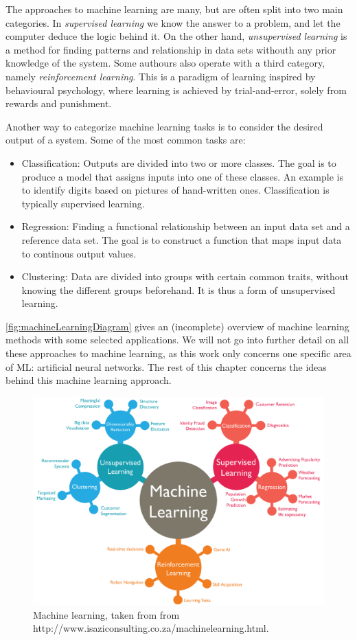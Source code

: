\documentclass[twoside,english]{uiofysmaster}
\begin{document}
The approaches to machine learning are many, but are often split into two main categories. 
In \textit{supervised learning} we know the answer to a problem,
and let the computer deduce the logic behind it. On the other hand, \textit{unsupervised learning}
is a method for finding patterns and relationship in data sets withouth any prior knowledge of the system.
Some authours also operate with a third category, namely \textit{reinforcement learning}. This is a paradigm 
of learning inspired by behavioural psychology, where learning is achieved by trial-and-error, 
solely from rewards and punishment.

Another way to categorize machine learning tasks is to consider the desired output of a system.
Some of the most common tasks are:
\begin{itemize}
 \item Classification: Outputs are divided into two or more classes. The goal is to 
 produce a model that assigns inputs into one of these classes. An example is to identify
 digits based on pictures of hand-written ones. Classification is typically supervised learning.  
 \item Regression: Finding a functional relationship between an input data set and a reference data set. 
 The goal is to construct a function that maps input data to continous output values. 
 \item Clustering: Data are divided into groups with certain common traits, without knowing the different groups beforehand.
 It is thus a form of unsupervised learning.  
\end{itemize} 
\autoref{fig:machineLearningDiagram} gives an (incomplete) overview of machine learning methods with some selected applications.
We will not go into further detail on all these approaches to machine learning, as this work only concerns
one specific area of ML: artificial neural networks. The rest of this chapter concerns the ideas behind this machine learning
approach. 
\begin{figure}
\begin{center}
 \includegraphics[width = \linewidth]{Figures/Theory/MachineLearningDiagram.png}
 \caption{Machine learning, taken from from http://www.isaziconsulting.co.za/machinelearning.html.}
 \label{fig:machineLearningDiagram}
\end{center}
\end{figure}
\end{document}

